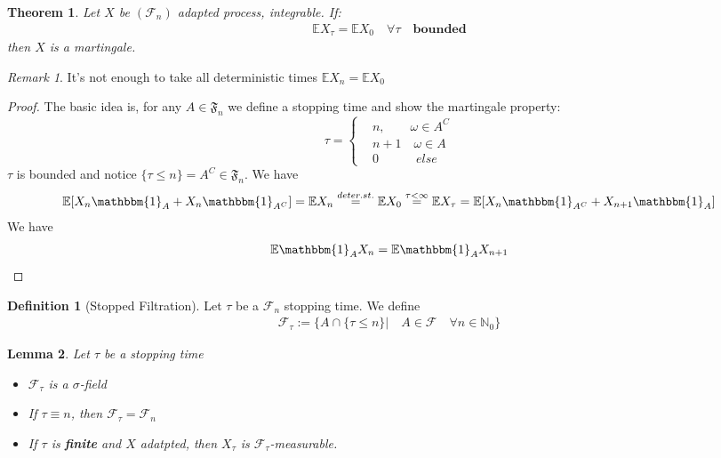 \documentclass[a4paper,11pt]{book}
\newtheorem{theorem}{Theorem}[section]
\newtheorem{lemma}[theorem]{Lemma}
\theoremstyle{definition}
\newtheorem{definition}{Definition}[section]
\theoremstyle{remark}
\newtheorem*{remark}{Remark}
\begin{document}
\begin{theorem}\label{Q2.1}
	Let $X$ be $(\mathcal{F}_n)$ adapted process, integrable. If:
	\begin{align*}
		\mathbb{E} X_\tau = \mathbb{E}X_0 \quad \forall \tau \quad \textbf{bounded}
	\end{align*}
	then $X$ is a martingale.
\end{theorem}
\begin{remark}
It's not enough to take all deterministic times	$\mathbb{E}X_n = \mathbb{E}X_0$
\end{remark}
\begin{proof}
The basic idea is, for any  $A \in \mathfrak{F}_{n}$ we define a stopping time and show the martingale property:
	\begin{equation*}
		\tau = \left\{
		\begin{aligned}
			&n, \qquad \omega \in A^C\\
			&n+1 \quad \omega \in  A\\
			&0 \quad \qquad else
		\end{aligned}
		\right.
	\end{equation*}
	$\tau$ is bounded and notice $\{\tau \le n\} = A^C \in \mathfrak{F}_n$. We have
	\begin{align*}
		\mathbb{E}[X_n\mathbbm{1}_{A} + X_n\mathbbm{1}_{A^C}]= \mathbb{E}X_n\overset{deter.st.}{=}
		\mathbb{E}X_0 \overset{\tau< \infty}{= } \mathbb{E}X_\tau = \mathbb{E}[X_n\mathbbm{1}_{A^C} + X_{n+1}\mathbbm{1}_{A}]
	\end{align*}
	We have
	\begin{align*}
		\mathbb{E}\mathbbm{1}_{A} X_n = \mathbb{E}\mathbbm{1}_{A}X_{n+1}
	\end{align*}
\end{proof}

\begin{definition}[Stopped Filtration]
	Let $\tau$ be a $\mathcal{F}_n$ stopping time. We define
	\begin{align*}
		\mathcal{F}_\tau:= \bigg \{ A \cap \{\tau \leq n \}|\quad A \in \mathcal{F} \quad \forall n \in \mathbb{N}_0 \bigg\}
	\end{align*}
\end{definition}

\begin{lemma}
	Let $\tau$ be a stopping time
	\begin{itemize}
		\item $\mathcal{F}_\tau$ is a $\sigma$-field
		\item If $\tau \equiv n$, then $\mathcal{F}_\tau = \mathcal{F}_n$
		\item If $\tau$ is \textbf{finite} and $X$ adatpted, then $X_\tau$ is $\mathcal{F}_\tau$-measurable.
	\end{itemize}
\end{lemma}
\end{document}
